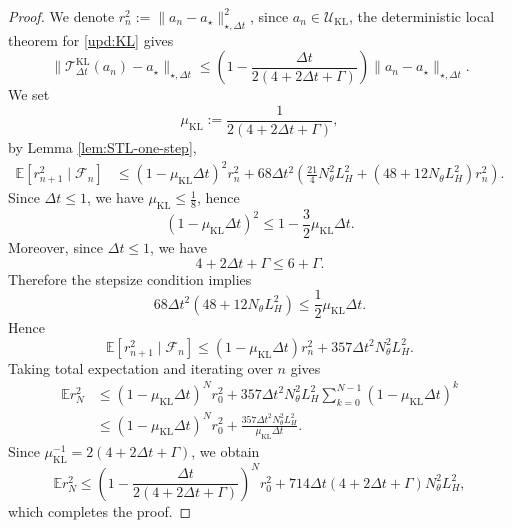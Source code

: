 \documentclass[11pt]{article}
\theoremstyle{plain}
\theoremstyle{definition}
\theoremstyle{remark}
\newcommand{\E}{\mathbb{E}}
\begin{document}
\begin{proof}
    We denote $r_n^2 := \|a_n-a_\star\|_{\star,\Delta t}^2$,
    since $a_n\in \mathcal{U}_{\mathrm{KL}}$, the deterministic local theorem for \eqref{upd:KL} gives
    \begin{equation*}
        \|\mathcal{T}_{\Delta t}^{\mathrm{KL}}(a_n)-a_\star\|_{\star,\Delta t}
        \leq
        \left(
            1-\frac{\Delta t}{2(4+2\Delta t+\Gamma)}
        \right)
        \|a_n-a_\star\|_{\star,\Delta t}.
    \end{equation*}
    We set
    \begin{equation*}
        \mu_{\mathrm{KL}}
        :=
        \frac{1}{2(4+2\Delta t+\Gamma)},
    \end{equation*}
    by Lemma \ref{lem:STL-one-step},
    \begin{align*}
        \E[r_{n+1}^2\mid\mathcal{F}_n]
        &\leq
        (1-\mu_{\mathrm{KL}}\Delta t)^2 r_n^2 +
        68\Delta t^2
        \left(
            \frac{21}{4}N_\theta^2L_H^2
            +
            (48+12N_\theta L_H^2)r_n^2
        \right).
    \end{align*}
    Since $\Delta t\leq 1$, we have $\mu_{\mathrm{KL}}\leq \frac{1}{8}$, hence
    \begin{equation*}
        (1-\mu_{\mathrm{KL}}\Delta t)^2
        \leq
        1-\frac{3}{2}\mu_{\mathrm{KL}}\Delta t.
    \end{equation*}
    Moreover, since $\Delta t\leq 1$, we have
    \begin{equation*}
        4+2\Delta t+\Gamma \leq 6+\Gamma.
    \end{equation*}
    Therefore the stepsize condition implies
    \begin{equation*}
        68\Delta t^2(48+12N_\theta L_H^2)
        \leq
        \frac{1}{2}\mu_{\mathrm{KL}}\Delta t.
    \end{equation*}
    Hence
    \begin{equation*}
        \E[r_{n+1}^2\mid \mathcal{F}_n]
        \leq
        (1-\mu_{\mathrm{KL}}\Delta t)r_n^2
        +
        357\Delta t^2N_\theta^2L_H^2.
    \end{equation*}
    Taking total expectation and iterating over $n$ gives
    \begin{align*}
        \E r_N^2
        &\leq
        (1-\mu_{\mathrm{KL}}\Delta t)^N r_0^2
        +
        357\Delta t^2N_\theta^2L_H^2
        \sum_{k=0}^{N-1}
        (1-\mu_{\mathrm{KL}}\Delta t)^k \\
        &\leq
        (1-\mu_{\mathrm{KL}}\Delta t)^N r_0^2
        +
        \frac{357\Delta t^2N_\theta^2L_H^2}{\mu_{\mathrm{KL}}\Delta t}.
    \end{align*}
    Since $\mu_{\mathrm{KL}}^{-1}=2(4+2\Delta t+\Gamma)$, we obtain
    \begin{equation*}
        \E r_N^2
        \leq
        \left(
            1-\frac{\Delta t}{2(4+2\Delta t+\Gamma)}
        \right)^N
        r_0^2
        +
        714\Delta t(4+2\Delta t+\Gamma)N_\theta^2L_H^2,
    \end{equation*}
    which completes the proof.
\end{proof}
\end{document}
